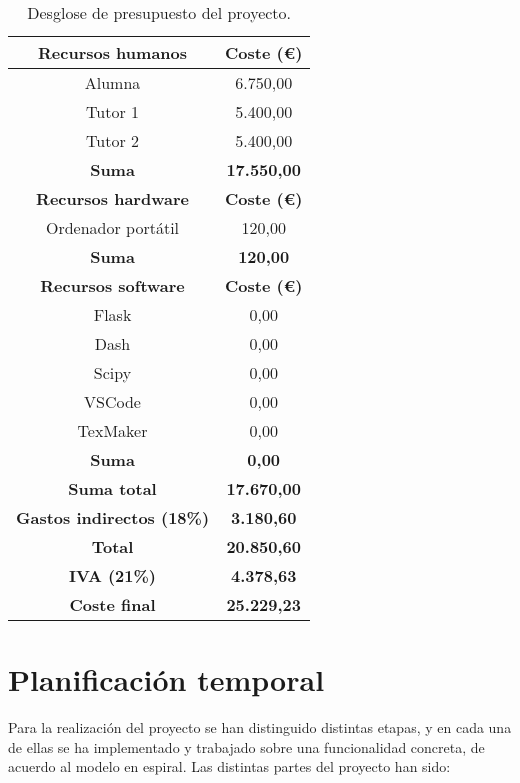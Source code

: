 \begin{table}[!h]
\caption{Desglose de presupuesto del proyecto.}
\begin{center}
\begin{tabular}{|c c|} 
 \hline
 \textbf{Recursos humanos} & \textbf{Coste (€)} \\ 
 \hline\hline
 Alumna & 6.750,00 \\
 \hline
 Tutor 1 & 5.400,00 \\
 \hline 
 Tutor 2 & 5.400,00 \\
 \hline
 \textbf{Suma} & \textbf{17.550,00} \\
 \hline
 \textbf{Recursos hardware} & \textbf{Coste (€)} \\ 
 \hline\hline
 Ordenador portátil & 120,00 \\
 \hline
 \textbf{Suma} & \textbf{120,00} \\
 \hline 
 \textbf{Recursos software} & \textbf{Coste (€)} \\
 \hline
  Flask & 0,00 \\
  \hline
  Dash & 0,00 \\
  \hline 
  Scipy & 0,00 \\
  \hline 
  VSCode & 0,00 \\
  \hline
  TexMaker & 0,00 \\
  \hline 
  \textbf{Suma} & \textbf{0,00} \\ 
 \hline\hline
 \textbf{Suma total} & \textbf{17.670,00} \\
 \hline\hline
 \textbf{Gastos indirectos (18\%)} & \textbf{3.180,60} \\ 
 \hline\hline
 \textbf{Total} & \textbf{20.850,60} \\ 
 \hline\hline
 \textbf{IVA (21\%)} & \textbf{4.378,63} \\ %
 \hline\hline
 \textbf{Coste final} & \textbf{25.229,23} \\  %
 \hline\hline

 \hline
\end{tabular}
\label{tabla_pres}
\end{center}
\end{table}

\section{Planificación temporal}

Para la realización del proyecto se han distinguido distintas etapas, y en cada una de ellas se ha implementado y trabajado sobre una funcionalidad concreta, de acuerdo al modelo en espiral. Las distintas partes del proyecto han sido:


